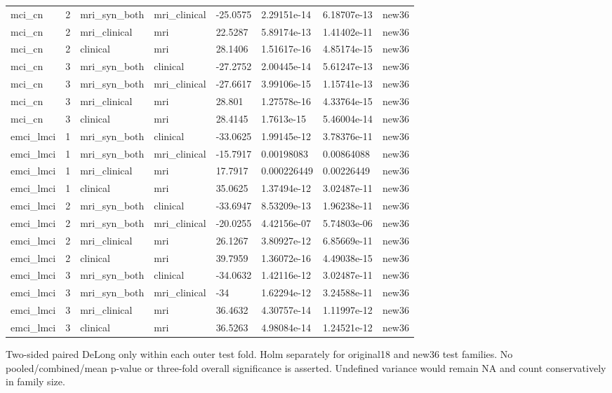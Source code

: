 \documentclass{article}
\begin{document}
\begin{landscape}
\begin{longtable}{llllllll}
mci\_cn & 2 & mri\_syn\_both & mri\_clinical & -25.0575 & 2.29151e-14 & 6.18707e-13 & new36 \\
mci\_cn & 2 & mri\_clinical & mri & 22.5287 & 5.89174e-13 & 1.41402e-11 & new36 \\
mci\_cn & 2 & clinical & mri & 28.1406 & 1.51617e-16 & 4.85174e-15 & new36 \\
mci\_cn & 3 & mri\_syn\_both & clinical & -27.2752 & 2.00445e-14 & 5.61247e-13 & new36 \\
mci\_cn & 3 & mri\_syn\_both & mri\_clinical & -27.6617 & 3.99106e-15 & 1.15741e-13 & new36 \\
mci\_cn & 3 & mri\_clinical & mri & 28.801 & 1.27578e-16 & 4.33764e-15 & new36 \\
mci\_cn & 3 & clinical & mri & 28.4145 & 1.7613e-15 & 5.46004e-14 & new36 \\
emci\_lmci & 1 & mri\_syn\_both & clinical & -33.0625 & 1.99145e-12 & 3.78376e-11 & new36 \\
emci\_lmci & 1 & mri\_syn\_both & mri\_clinical & -15.7917 & 0.00198083 & 0.00864088 & new36 \\
emci\_lmci & 1 & mri\_clinical & mri & 17.7917 & 0.000226449 & 0.00226449 & new36 \\
emci\_lmci & 1 & clinical & mri & 35.0625 & 1.37494e-12 & 3.02487e-11 & new36 \\
emci\_lmci & 2 & mri\_syn\_both & clinical & -33.6947 & 8.53209e-13 & 1.96238e-11 & new36 \\
emci\_lmci & 2 & mri\_syn\_both & mri\_clinical & -20.0255 & 4.42156e-07 & 5.74803e-06 & new36 \\
emci\_lmci & 2 & mri\_clinical & mri & 26.1267 & 3.80927e-12 & 6.85669e-11 & new36 \\
emci\_lmci & 2 & clinical & mri & 39.7959 & 1.36072e-16 & 4.49038e-15 & new36 \\
emci\_lmci & 3 & mri\_syn\_both & clinical & -34.0632 & 1.42116e-12 & 3.02487e-11 & new36 \\
emci\_lmci & 3 & mri\_syn\_both & mri\_clinical & -34 & 1.62294e-12 & 3.24588e-11 & new36 \\
emci\_lmci & 3 & mri\_clinical & mri & 36.4632 & 4.30757e-14 & 1.11997e-12 & new36 \\
emci\_lmci & 3 & clinical & mri & 36.5263 & 4.98084e-14 & 1.24521e-12 & new36 \\
\end{longtable}
\noindent\parbox{\linewidth}{\footnotesize Two-sided paired DeLong only within each outer test fold. Holm separately for original18 and new36 test families. No pooled/combined/mean p-value or three-fold overall significance is asserted. Undefined variance would remain NA and count conservatively in family size.}
\endgroup
\end{landscape}
\end{document}

